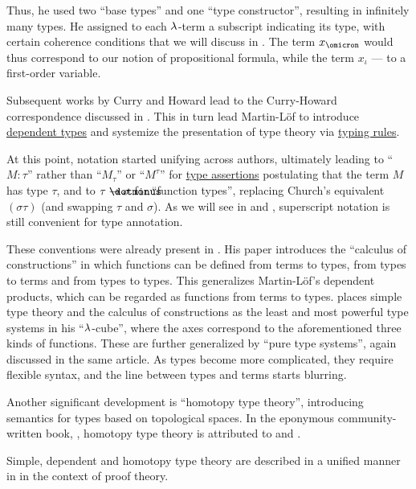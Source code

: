 \begin{remark}
  Thus, he used two \enquote{base types} and one \enquote{type constructor}, resulting in infinitely many types. He assigned to each \( \mathrm{\lambda} \)-term a subscript indicating its type, with certain coherence conditions that we will discuss in . The term \( x_\omicron \) would thus correspond to our notion of propositional formula, while the term \( x_\iota \) --- to a first-order variable.

  Subsequent works by Curry and Howard lead to the Curry-Howard correspondence discussed in . This in turn lead Martin-Löf to introduce \hyperref[rem:dependent_type]{dependent types} and systemize the presentation of type theory via \hyperref[def:typing_rule]{typing rules}.

  At this point, notation started unifying across authors, ultimately leading to \enquote{\( M: \tau \)} rather than \enquote{\( M_\tau \)} or \enquote{\( M^\tau \)} for \hyperref[def:type_assertion]{type assertions} postulating that the term \( M \) has type \( \tau \), and to \( \tau \synimplies \sigma \) for \enquote{function types}, replacing Church's equivalent \( (\sigma\tau) \) (and swapping \( \tau \) and \( \sigma \)). As we will see in  and , superscript notation is still convenient for type annotation.

  These conventions were already present in . His paper introduces the \enquote{calculus of constructions} in which functions can be defined from terms to types, from types to terms and from types to types. This generalizes Martin-L\"of's dependent products, which can be regarded as functions from terms to types.  places simple type theory and the calculus of constructions as the least and most powerful type systems in his \enquote{\( \mathrm{\lambda} \)-cube}, where the axes correspond to the aforementioned three kinds of functions. These are further generalized by \enquote{pure type systems}, again discussed in the same article. As types become more complicated, they require flexible syntax, and the line between types and terms starts blurring.

  Another significant development is \enquote{homotopy type theory}, introducing semantics for types based on topological spaces. In the eponymous community-written book, \cite{UnivalentProject2024OctoberHoTT}, homotopy type theory is attributed to \cite{Voevodski2006HoTT} and \cite{AwodeyWarren2009HoTT}.

  Simple, dependent and homotopy type theory are described in a unified manner in \cite{Mimram2020Types} in the context of proof theory.
\end{remark}

